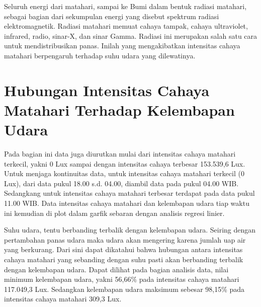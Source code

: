 Seluruh energi dari matahari, sampai ke Bumi dalam bentuk radiasi matahari, sebagai bagian dari sekumpulan energi yang disebut spektrum radiasi elektromagnetik. Radiasi matahari memuat cahaya tampak, cahaya ultraviolet, infrared, radio, sinar-X, dan sinar Gamma. Radiasi ini merupakan salah satu cara untuk mendistribusikan panas. Inilah yang mengakibatkan intensitas cahaya matahari berpengaruh terhadap suhu udara yang dilewatinya.

\section{Hubungan Intensitas Cahaya Matahari Terhadap Kelembapan Udara}
Pada bagian ini data juga diurutkan mulai dari intensitas cahaya matahari terkecil, yakni 0 Lux sampai dengan intensitas cahaya terbesar 153.539,6 Lux. Untuk menjaga kontinuitas data, untuk intensitas cahaya matahari terkecil (0 Lux), dari data pukul 18.00 s.d. 04.00, diambil data pada pukul 04.00 WIB. Sedangkang untuk intensitas cahaya matahari terbesar terdapat pada data pukul 11.00 WIB. Data intensitas cahaya matahari dan kelembapan udara tiap waktu ini kemudian di plot dalam garfik sebaran dengan analisis regresi linier.

Suhu udara, tentu berbanding terbalik dengan kelembapan udara. Seiring dengan pertambahan panas udara maka udara akan mengering karena jumlah uap air yang berkurang. Dari sini dapat dikatahui bahwa hubungan antara intensitas cahaya matahari yang sebanding dengan suhu pasti akan berbanding terbalik dengan kelembapan udara. Dapat dilihat pada bagian analisis data, nilai minimum kelembapan udara, yakni 56,66\% pada intensitas cahaya matahari 117.049,3 Lux. Sedangkan kelembapan udara maksimum sebesar 98,15\% pada intensitas cahaya matahari 309,3 Lux.
